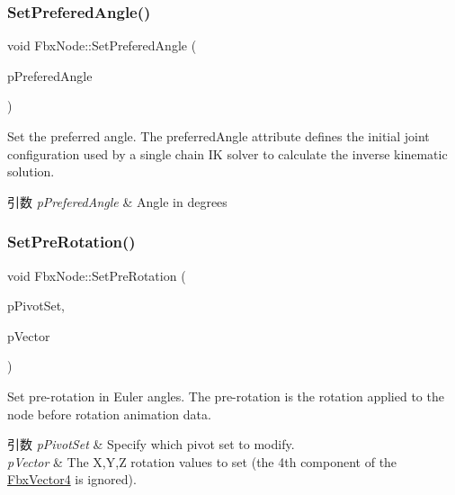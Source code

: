 \subsubsection{\texorpdfstring{Set\+Prefered\+Angle()}{SetPreferedAngle()}}
{\footnotesize\ttfamily void Fbx\+Node\+::\+Set\+Prefered\+Angle (\begin{DoxyParamCaption}\item[{\hyperlink{class_fbx_vector4}{Fbx\+Vector4}}]{p\+Prefered\+Angle }\end{DoxyParamCaption})}

Set the preferred angle. The preferred\+Angle attribute defines the initial joint configuration used by a single chain IK solver to calculate the inverse kinematic solution. 
\begin{DoxyParams}{引数}
{\em p\+Prefered\+Angle} & Angle in degrees \\
\hline
\end{DoxyParams}
\mbox{\label{class_fbx_node_ac15a436bf09b95e030af68481606615e}} 
\subsubsection{\texorpdfstring{Set\+Pre\+Rotation()}{SetPreRotation()}}
{\footnotesize\ttfamily void Fbx\+Node\+::\+Set\+Pre\+Rotation (\begin{DoxyParamCaption}\item[{\hyperlink{class_fbx_node_ae62b7311ac4727654cdf1ebd5cbf7343}{E\+Pivot\+Set}}]{p\+Pivot\+Set,  }\item[{\hyperlink{class_fbx_vector4}{Fbx\+Vector4}}]{p\+Vector }\end{DoxyParamCaption})}

Set pre-\/rotation in Euler angles. The pre-\/rotation is the rotation applied to the node before rotation animation data. 
\begin{DoxyParams}{引数}
{\em p\+Pivot\+Set} & Specify which pivot set to modify. \\
\hline
{\em p\+Vector} & The X,Y,Z rotation values to set (the 4th component of the \hyperlink{class_fbx_vector4}{Fbx\+Vector4} is ignored). \\
\hline
\end{DoxyParams}
\mbox{\label{class_fbx_node_a32def733f7dfd89092f914be749741b8}} 
